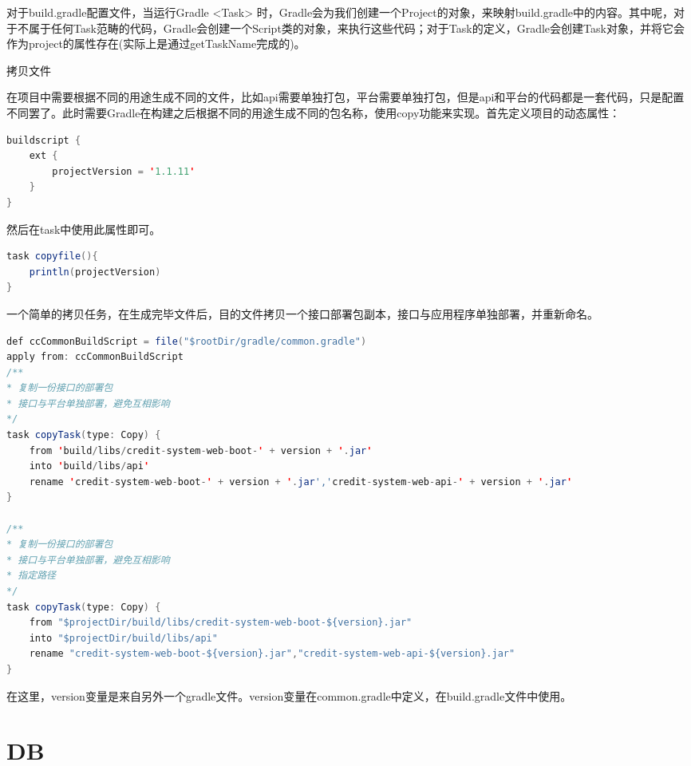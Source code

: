 \documentclass[12pt]{book}
\makeatletter
\numberwithin{dummy}{section}
\theoremstyle{ocrenumbox}
\theoremstyle{blacknumex}
\theoremstyle{blacknumbox}
\theoremstyle{ocrenum}
\renewcommand\paragraph{\@startsection{paragraph}{4}{\z@}
	{-2ex \@plus-.2ex \@minus .2ex}
	{.1ex}
	{\normalfont\small\sffamily\bfseries}}
\makeatother
\begin{document}
对于build.gradle配置文件，当运行Gradle <Task> 时，Gradle会为我们创建一个Project的对象，来映射build.gradle中的内容。其中呢，对于不属于任何Task范畴的代码，Gradle会创建一个Script类的对象，来执行这些代码；对于Task的定义，Gradle会创建Task对象，并将它会作为project的属性存在(实际上是通过getTaskName完成的)。


\paragraph{拷贝文件}

在项目中需要根据不同的用途生成不同的文件，比如api需要单独打包，平台需要单独打包，但是api和平台的代码都是一套代码，只是配置不同罢了。此时需要Gradle在构建之后根据不同的用途生成不同的包名称，使用copy功能来实现。首先定义项目的动态属性：

\begin{lstlisting}[language=Java]
buildscript {
	ext {
		projectVersion = '1.1.11'
	}
}
\end{lstlisting}

然后在task中使用此属性即可。

\begin{lstlisting}[language=Java]
task copyfile(){
	println(projectVersion)
}
\end{lstlisting}

一个简单的拷贝任务，在生成完毕文件后，目的文件拷贝一个接口部署包副本，接口与应用程序单独部署，并重新命名。

\begin{lstlisting}[language=Java]
def ccCommonBuildScript = file("$rootDir/gradle/common.gradle")
apply from: ccCommonBuildScript
/**
* 复制一份接口的部署包
* 接口与平台单独部署，避免互相影响
*/
task copyTask(type: Copy) {
	from 'build/libs/credit-system-web-boot-' + version + '.jar'
	into 'build/libs/api'
	rename 'credit-system-web-boot-' + version + '.jar','credit-system-web-api-' + version + '.jar'
}

/**
* 复制一份接口的部署包
* 接口与平台单独部署，避免互相影响
* 指定路径
*/
task copyTask(type: Copy) {
	from "$projectDir/build/libs/credit-system-web-boot-${version}.jar"
	into "$projectDir/build/libs/api"
	rename "credit-system-web-boot-${version}.jar","credit-system-web-api-${version}.jar"
}
\end{lstlisting}

在这里，version变量是来自另外一个gradle文件。version变量在common.gradle中定义，在build.gradle文件中使用。


\part{DB}
\end{document}
